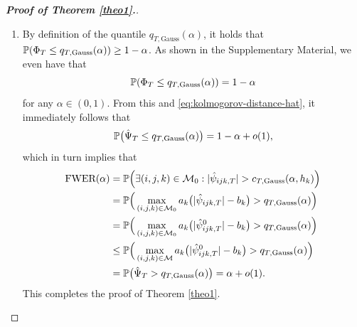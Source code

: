\documentclass[a4paper,12pt]{article}
\numberwithin{equation}{section}
\begin{document}
\begin{proof}[\textnormal{\textbf{Proof of Theorem \ref{theo1}.}}]
\begin{enumerate}[label=\textit{Step \arabic*.}, leftmargin=0cm, itemindent=1.45cm]
\item By definition of the quantile $q_{T,\text{Gauss}}(\alpha)$, it holds that $\mathbb{P}(\Phi_T \le q_{T,\text{Gauss}}(\alpha)) \ge 1-\alpha$. As shown in the Supplementary Material, we even have that  
\begin{equation}\label{eq:quant-exact}
\mathbb{P}(\Phi_T \le q_{T,\text{Gauss}}(\alpha)) = 1-\alpha
\end {equation} 
for any $\alpha \in (0,1)$. From this and \eqref{eq:kolmogorov-distance-hat}, it immediately follows that  
\begin{equation}\label{eq:probbound-Psihat}
\mathbb{P} \big( \hat{\Psi}_T \le q_{T,\text{Gauss}}(\alpha) \big) = 1 - \alpha + o(1), 
\end{equation}
which in turn implies that 
\begin{align*}
\text{FWER}(\alpha)
 & = \mathbb{P} \Big( \exists (i,j,k) \in \mathcal{M}_0: |\hat{\psi}_{ijk,T}| > c_{T,\text{Gauss}}(\alpha,h_k) \Big) \\
 & = \mathbb{P} \Big( \max_{(i,j,k) \in \mathcal{M}_0} a_k \big( |\hat{\psi}_{ijk,T}| - b_k \big) > q_{T,\text{Gauss}}(\alpha) \Big) \\
 & = \mathbb{P} \Big( \max_{(i,j,k) \in \mathcal{M}_0} a_k \big( |\hat{\psi}_{ijk,T}^0| - b_k \big) > q_{T,\text{Gauss}}(\alpha) \Big) \\
 & \le \mathbb{P} \Big( \max_{(i,j,k) \in \mathcal{M}} a_k \big( |\hat{\psi}_{ijk,T}^0| - b_k \big) > q_{T,\text{Gauss}}(\alpha) \Big) \\
 & = \mathbb{P} \big( \hat{\Psi}_T > q_{T,\text{Gauss}}(\alpha) \big) = \alpha + o(1).
\end{align*}
This completes the proof of Theorem \ref{theo1}. \qedhere


\end{enumerate}
\end{proof}
\end{document}
